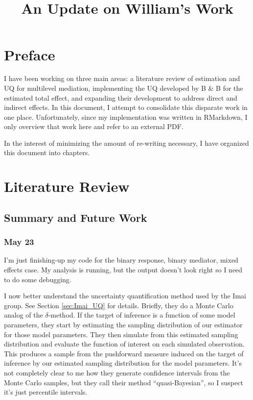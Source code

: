 \documentclass{report}
\title{An Update on William's Work}
\begin{document}
\maketitle

\chapter*{Preface}


I have been working on three main areas: a literature review of estimation and UQ for multilevel mediation, implementing the UQ developed by B \& B for the estimated total effect, and expanding their development to address direct and indirect effects. In this document, I attempt to consolidate this disparate work in one place. Unfortunately, since my implementation was written in RMarkdown, I only overview that work here and refer to an external PDF.

In the interest of minimizing the amount of re-writing necessary, I have organized this document into chapters.

\tableofcontents


\chapter{Literature Review}

\section{Summary and Future Work}

\subsection{May 23}

I'm just finishing-up my code for the binary response, binary mediator, mixed effects case. My analysis is running, but the output doesn't look right so I need to do some debugging. 

I now better understand the uncertainty quantification method used by the Imai group. See Section \ref{sec:Imai_UQ} for details. Briefly, they do a Monte Carlo analog of the $\delta$-method. If the target of inference is a function of some model parameters, they start by estimating the sampling distribution of our estimator for those model parameters. They then simulate from this estimated sampling distribution and evaluate the function of interest on each simulated observation. This produces a sample from the pushforward measure induced on the target of inference by our estimated sampling distribution for the model parameters. It's not completely clear to me how they generate confidence intervals from the Monte Carlo samples, but they call their method ``quasi-Bayesian'', so I suspect it's just percentile intervals. 
\end{document}
